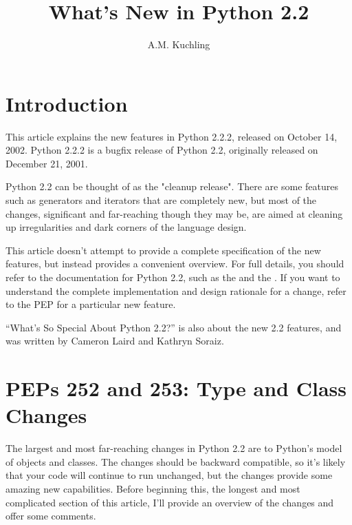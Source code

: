 \documentclass{howto}
\title{What's New in Python 2.2}
\author{A.M. Kuchling}
\begin{document}
\maketitle\tableofcontents

\section{Introduction}

This article explains the new features in Python 2.2.2, released on
October 14, 2002.  Python 2.2.2 is a bugfix release of Python 2.2,
originally released on December 21, 2001.

Python 2.2 can be thought of as the "cleanup release".  There are some
features such as generators and iterators that are completely new, but
most of the changes, significant and far-reaching though they may be,
are aimed at cleaning up irregularities and dark corners of the
language design.

This article doesn't attempt to provide a complete specification of
the new features, but instead provides a convenient overview.  For
full details, you should refer to the documentation for Python 2.2,
such as the
 and the
.  If you want to understand the complete
implementation and design rationale for a change, refer to the PEP for
a particular new feature.

\begin{seealso}

{``What's So Special About Python 2.2?'' is also about the new 2.2
features, and was written by Cameron Laird and Kathryn Soraiz.}

\end{seealso}


\section{PEPs 252 and 253: Type and Class Changes}

The largest and most far-reaching changes in Python 2.2 are to
Python's model of objects and classes.  The changes should be backward
compatible, so it's likely that your code will continue to run
unchanged, but the changes provide some amazing new capabilities.
Before beginning this, the longest and most complicated section of
this article, I'll provide an overview of the changes and offer some
comments.
\end{document}
